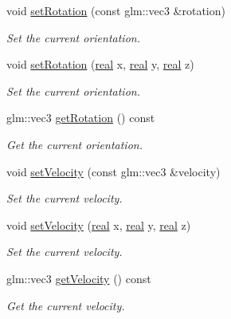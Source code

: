 \begin{DoxyCompactItemize}
void \mbox{\hyperlink{classr3_1_1_rigid_body_aeaad22c99a9254f38c93e8e622bb4c01}{set\+Rotation}} (const glm\+::vec3 \&rotation)
\begin{DoxyCompactList}\small\item\em Set the current orientation. \end{DoxyCompactList}\item 
void \mbox{\hyperlink{classr3_1_1_rigid_body_a5ac826cea8762df5a5b5c6113d84ad2b}{set\+Rotation}} (\mbox{\hyperlink{namespacer3_ab2016b3e3f743fb735afce242f0dc1eb}{real}} x, \mbox{\hyperlink{namespacer3_ab2016b3e3f743fb735afce242f0dc1eb}{real}} y, \mbox{\hyperlink{namespacer3_ab2016b3e3f743fb735afce242f0dc1eb}{real}} z)
\begin{DoxyCompactList}\small\item\em Set the current orientation. \end{DoxyCompactList}\item 
glm\+::vec3 \mbox{\hyperlink{classr3_1_1_rigid_body_afd8accdd3c9a75053eaeac0c9c35d07d}{get\+Rotation}} () const
\begin{DoxyCompactList}\small\item\em Get the current orientation. \end{DoxyCompactList}\item 
void \mbox{\hyperlink{classr3_1_1_rigid_body_a033bf2bf8e128b5438fdd91f7d29c051}{set\+Velocity}} (const glm\+::vec3 \&velocity)
\begin{DoxyCompactList}\small\item\em Set the current velocity. \end{DoxyCompactList}\item 
void \mbox{\hyperlink{classr3_1_1_rigid_body_a244d24ec2368098f4ac38603a982ea54}{set\+Velocity}} (\mbox{\hyperlink{namespacer3_ab2016b3e3f743fb735afce242f0dc1eb}{real}} x, \mbox{\hyperlink{namespacer3_ab2016b3e3f743fb735afce242f0dc1eb}{real}} y, \mbox{\hyperlink{namespacer3_ab2016b3e3f743fb735afce242f0dc1eb}{real}} z)
\begin{DoxyCompactList}\small\item\em Set the current velocity. \end{DoxyCompactList}\item 
glm\+::vec3 \mbox{\hyperlink{classr3_1_1_rigid_body_a17b3c0a13865cdca6e43037ec7107d58}{get\+Velocity}} () const
\begin{DoxyCompactList}\small\item\em Get the current velocity. \end{DoxyCompactList}\item 

\end{DoxyCompactItemize}

